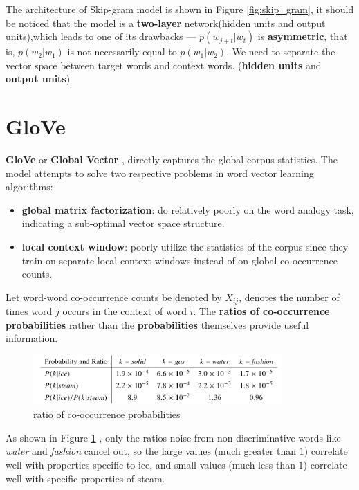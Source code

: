 \documentclass[a3paper, 12pt]{book} %
\begin{document}
The architecture of Skip-gram model is shown in Figure \ref{fig:skip_gram}, it should be noticed that the model is a \textbf{two-layer} network(hidden units and output units),which leads to one of its drawbacks --- $p(w_{j+t}|w_t)$ is \textbf{asymmetric}, that is, $p(w_2|w_1)$ is not necessarily equal to $p(w_1|w_2)$. We need to separate the vector space between target words and context words. (\textbf{hidden units} and \textbf{output units})


\section{GloVe}
\textbf{GloVe} or \textbf{Global Vector} \citep{pennington2014glove}, directly captures the global corpus statistics. The model attempts to solve two respective problems in word vector learning algorithms:

\begin{itemize}
	\item \textbf{global matrix factorization}: do relatively poorly on the word analogy task, indicating a sub-optimal vector space structure. 
	\item \textbf{local context window}: poorly utilize the statistics of the corpus since they train on separate local context windows instead of on global co-occurrence counts.
\end{itemize}

Let word-word co-occurrence counts be denoted by $X_{ij}$, denotes the number of times word $j$ occurs in the context of word $i$. The \textbf{ratios of co-occurrence probabilities} rather than the \textbf{probabilities} themselves provide useful information.

\begin{figure}[htpb]
	\centering
	\includegraphics[width=9.5cm]{figures/glove_co-occurrence_ratio.png}
	\caption{ratio of co-occurrence probabilities}
	\label{fig:glove_co-occurrence_ratio}
\end{figure}

As shown in Figure \ref{fig:glove_co-occurrence_ratio} , only the ratios noise from non-discriminative  words like \emph{water} and \emph{fashion} cancel out, so the large values (much greater than $1$) correlate well with properties specific to ice, and small values (much less than $1$) correlate well with specific properties of steam.
\end{document}
